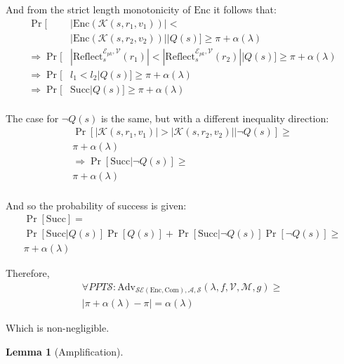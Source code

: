 \documentclass[conference, letterpaper, 10pt]{IEEEtran}
\newtheorem{lemma}{Lemma}
\begin{document}
\begin{IEEEproof}
And from the strict length monotonicity of $\textrm{Enc}$ it follows that:
\begin{align*}
    \Pr[&|\textrm{Enc}(\mathcal{K}(s, r_1, v_1))| <\\&|\textrm{Enc}(\mathcal{K}(s, r_2, v_2))||Q(s)]
        \geq \pi + \alpha(\lambda)\\
    \Rightarrow \Pr[&
        |\text{Reflect}^{\mathcal{E}_{pk}, \mathcal{V}}_s(r_1)|
        <
        |\text{Reflect}^{\mathcal{E}_{pk}, \mathcal{V}}_s(r_2)||Q(s)
    ]
        \geq \pi + \alpha(\lambda)\\
    \Rightarrow \Pr[&l_1 < l_2|Q(s)]
        \geq \pi + \alpha(\lambda)\\
    \Rightarrow \Pr[&\text{Succ}|Q(s)]
        \geq \pi + \alpha(\lambda)\\
\end{align*}

The case for $\lnot Q(s)$ is the same, but with a different inequality direction:
\begin{align*}
    \Pr[|\mathcal{K}(s, r_1, v_1)| > |\mathcal{K}(s, r_2, v_2)||\lnot Q(s)]
        \geq\\
        \pi + \alpha(\lambda)\\
    \Rightarrow \Pr[\text{Succ}|\lnot Q(s)] \geq\\
    \pi + \alpha(\lambda)\\
\end{align*}

And so the probability of success is given:
\begin{align*}
    \Pr[\text{Succ}] =\\
    \Pr[\text{Succ}|Q(s)]\Pr[Q(s)]
    +
    \Pr[\text{Succ}|\lnot Q(s)]\Pr[\lnot Q(s)] \geq\\
    \pi + \alpha(\lambda)
\end{align*}

Therefore,
\begin{align*}
    \forall PPT \mathcal{S}:
    \text{Adv}_{\mathcal{SE}(\textrm{Enc}, \textrm{Com}), \mathcal{A}, \mathcal{S}}
        (\lambda, f, \mathcal{V}, \mathcal{M}, g)
    \geq\\
    |\pi + \alpha(\lambda) - \pi| = \alpha(\lambda)
\end{align*}

Which is non-negligible.

\end{IEEEproof}

\begin{lemma}[Amplification]
\end{lemma}
\end{document}
